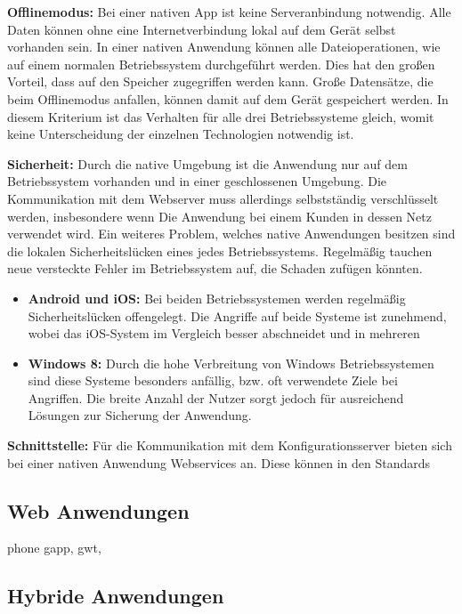 \textbf{Offlinemodus:} Bei einer nativen App ist keine Serveranbindung notwendig. Alle Daten können ohne eine Internetverbindung lokal auf dem Gerät selbst vorhanden sein. In einer nativen Anwendung können alle Dateioperationen, wie auf einem normalen Betriebssystem durchgeführt werden. Dies hat den großen Vorteil, dass auf den Speicher zugegriffen werden kann. Große Datensätze, die beim Offlinemodus anfallen, können damit auf dem Gerät gespeichert werden.  In diesem Kriterium ist das Verhalten für alle drei Betriebssysteme gleich, womit keine Unterscheidung der einzelnen Technologien notwendig ist.\par

\textbf{Sicherheit:} Durch die native Umgebung ist die Anwendung nur auf dem Betriebssystem vorhanden und in einer geschlossenen Umgebung. Die Kommunikation mit dem Webserver muss allerdings selbstständig verschlüsselt werden, insbesondere wenn Die Anwendung bei einem Kunden in dessen Netz verwendet wird. Ein weiteres Problem, welches native Anwendungen besitzen sind die lokalen Sicherheitslücken eines jedes Betriebssystems. Regelmäßig tauchen neue versteckte Fehler im Betriebssystem auf, die Schaden zufügen könnten. 

\begin{itemize}
        \item \textbf{Android und iOS:} Bei beiden Betriebssystemen werden regelmäßig Sicherheitslücken offengelegt. Die Angriffe auf beide Systeme ist zunehmend, wobei das iOS-System im Vergleich besser abschneidet und in mehreren 
        
        \item \textbf{Windows 8:} Durch die hohe Verbreitung von Windows Betriebssystemen sind diese Systeme besonders anfällig, bzw. oft verwendete Ziele bei Angriffen. Die breite Anzahl der Nutzer sorgt jedoch für ausreichend Lösungen zur Sicherung der Anwendung.
        
       
\end{itemize}

\textbf{Schnittstelle:} Für die Kommunikation mit dem Konfigurationsserver bieten sich bei einer nativen Anwendung Webservices an. Diese können in den Standards 
\subsection{Web Anwendungen}
phone gapp, gwt, 
\subsection{Hybride Anwendungen}
